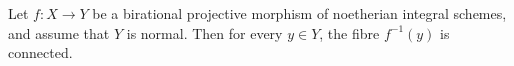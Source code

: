 Let $f: X \to Y$ be a birational projective morphism of noetherian integral schemes, and assume that $Y$ is normal. Then for every $y \in Y$, the fibre $f^{-1}(y)$ is connected.
